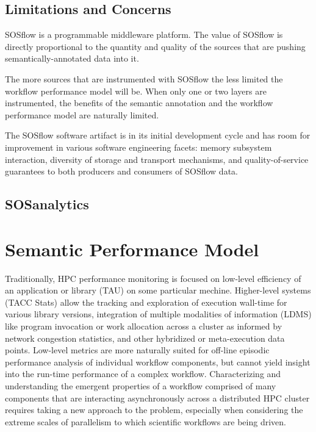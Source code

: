 \subsection{Limitations and Concerns}
SOSflow is a programmable middleware platform.  The value of SOSflow is
directly proportional to the quantity and quality of the sources that
are pushing semantically-annotated data into it.

The more sources that are instrumented with SOSflow the less limited
the workflow performance model will be. When only one or two layers
are instrumented, the benefits of the semantic annotation and the
workflow performance model are naturally limited.

The SOSflow software artifact is in its initial development cycle and
has room for improvement in various software engineering facets:
memory subsystem interaction, diversity of storage and transport
mechanisms, and quality-of-service guarantees to both producers and
consumers of SOSflow data.


\subsection{SOSanalytics}






\section{Semantic Performance Model}
Traditionally, HPC performance monitoring is focused on low-level
efficiency of an application or library (TAU) on some particular mechine.
Higher-level systems (TACC Stats) allow the tracking and exploration
of execution wall-time for various library versions, integration of
multiple modalities of information (LDMS) like program invocation or
work allocation across a cluster as informed by network congestion
statistics, and other hybridized or meta-execution data points.
Low-level metrics are more naturally suited for off-line episodic
performance analysis of individual workflow components, but cannot
yield insight into the run-time performance of a complex workflow.
Characterizing and understanding the emergent properties of a workflow
comprised of many components that are interacting asynchronously
across a distributed HPC cluster requires taking a new approach to the
problem, especially when considering the extreme scales of parallelism
to which scientific workflows are being driven.

